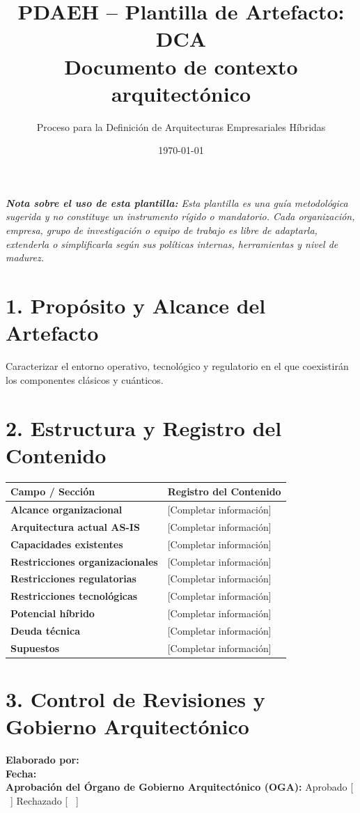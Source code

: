 \documentclass[11pt,a4paper]{article}
\title{\textbf{\color{brandgreen} PDAEH -- Plantilla de Artefacto: DCA} \\[0.3em] \large Documento de contexto arquitectónico}
\author{Proceso para la Definición de Arquitecturas Empresariales Híbridas}
\date{\today}
\begin{document}
\maketitle

\noindent \textit{\textbf{Nota sobre el uso de esta plantilla:} Esta plantilla es una guía metodológica sugerida y no constituye un instrumento rígido o mandatorio. Cada organización, empresa, grupo de investigación o equipo de trabajo es libre de adaptarla, extenderla o simplificarla según sus políticas internas, herramientas y nivel de madurez.}

\section*{1. Propósito y Alcance del Artefacto}
Caracterizar el entorno operativo, tecnológico y regulatorio en el que coexistirán los componentes clásicos y cuánticos.

\section*{2. Estructura y Registro del Contenido}
\begin{tabularx}{\textwidth}{|>{\bfseries}p{4.5cm}|X|}
    \hline
    \rowcolor[gray]{0.92} Campo / Sección & Registro del Contenido \\ \hline
    \textbf{Alcance organizacional} & [Completar información] \\ \hline
    \textbf{Arquitectura actual AS-IS} & [Completar información] \\ \hline
    \textbf{Capacidades existentes} & [Completar información] \\ \hline
    \textbf{Restricciones organizacionales} & [Completar información] \\ \hline
    \textbf{Restricciones regulatorias} & [Completar información] \\ \hline
    \textbf{Restricciones tecnológicas} & [Completar información] \\ \hline
    \textbf{Potencial híbrido} & [Completar información] \\ \hline
    \textbf{Deuda técnica} & [Completar información] \\ \hline
    \textbf{Supuestos} & [Completar información] \\ \hline
\end{tabularx}

\vspace{1.2cm}
\section*{3. Control de Revisiones y Gobierno Arquitectónico}
\noindent \textbf{Elaborado por:} \hrulefill \\[0.5em]
\textbf{Fecha:} \hrulefill \\[0.5em]
\textbf{Aprobación del Órgano de Gobierno Arquitectónico (OGA):} Aprobado [ \, ] \quad Rechazado [ \, ]
\end{document}
